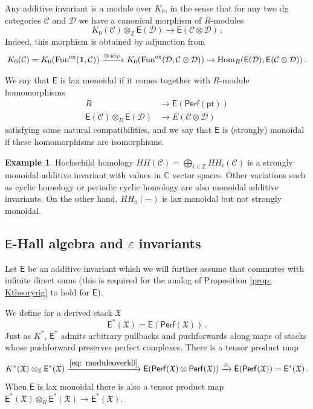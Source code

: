 \documentclass[12pt]{amsart}
\theoremstyle{definition}
\newtheorem{example}[definition]{Example}
\newcommand{\sE}{\mathsf{E}}
\newcommand{\BC}{{\mathbb{C}}}
\newcommand{\BZ}{{\mathbb{Z}}}
\newcommand{\CC}{{\mathcal C}}
\newcommand{\CD}{{\mathcal D}}
\newcommand{\1}{\mathbf 1}
\newcommand{\FX}{{\mathfrak{X}}}
\DeclareMathOperator{\id}{id}
\newcommand{\pt}{{\mathsf{pt}}}
\newcommand{\Perf}{\mathsf{Perf}}
\newcommand{\Hom}{\mathrm{Hom}}
\begin{document}
Any additive invariant is a module over $K_0$, in the sense that for any two dg categories $\CC$ and $\CD$ we have a canonical morphism of $R$-modules
    \begin{equation}
        \label{eq: moduleoverk0}
    K_0(\mathcal C)\otimes_\BZ \sE(\mathcal D)\to \sE(\mathcal C\otimes \mathcal D)\,.\end{equation}
Indeed, this morphism is obtained by adjunction from
    \begin{align*}
        K_0(\CC)=K_0(\textup{Fun}^{\textup{ex}}({\bf 1} ,\CC))\xrightarrow{\otimes \id_{\CD}} K_0(\textup{Fun}^{\textup{ex}}(\CD, \CC\otimes \CD))\to \Hom_{R}(\sE(\CD), \sE(\CC\otimes \CD))\,. 
    \end{align*}

    
We say that $\sE$ is lax monoidal if it comes together with $R$-module homomorphisms
\begin{align*}R&\to \sE(\Perf(\pt))\\
\sE(\CC)\otimes_R \sE(\CD)&\to E(\CC\otimes \CD)
\end{align*}
satisfying some natural compatibilities, and we say that $\sE$ is (strongly) monoidal if these homomorphisms are isomorphisms.

    
\begin{example}
Hochschild homology $HH(\mathcal \CC)=\bigoplus_{i\in \BZ}HH_i(\mathcal C)$ is a strongly monoidal additive invariant with values in $\BC$ vector spaces. Other variations such as cyclic homology or periodic cyclic homology are also monoidal additive invariants. On the other hand, $HH_0(-)$ is lax monoidal but not strongly monoidal.
\end{example}



\subsection{$\sE$-Hall algebra and $\varepsilon$ invariants} Let $\sE$ be an additive invariant which we will further assume that commutes with infinite direct sums (this is required for the analog of Proposition \ref{prop: Ktheoryrig} to hold for $\sE$). 

We define for a derived stack $\FX$
\[\sE^\ast(\FX)=\sE(\Perf(\FX))\,.\]
Just as $K^\ast$, $\sE^\ast$ admits arbitrary pullbacks and pushforwards along maps of stacks whose pushforward preserves perfect complexes. There is a tensor product map
\begin{equation}\label{eq: E*moduleoverK*}
K^\ast(\FX)\otimes_\BZ \sE^\ast(\FX)\xrightarrow{\eqref{eq: moduleoverk0}} \sE(\Perf(\FX)\otimes \Perf(\FX))\xrightarrow{\otimes} \sE(\Perf(\FX))=\sE^\ast(\FX)\,.\end{equation}
When $\sE$ is lax monoidal there is also a tensor product map $\sE^\ast(\FX)\otimes_R \sE^\ast(\FX)\to \sE^\ast(\FX)$. 
\end{document}

